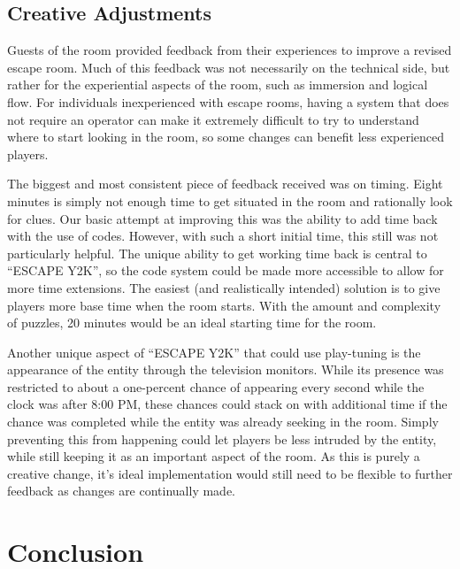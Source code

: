 \documentclass[conference]{IEEEtran}
\begin{document}
\subsection{Creative Adjustments}
Guests of the room provided feedback from their experiences to improve a revised escape room. Much of this feedback was 
not necessarily on the technical side, but rather for the experiential aspects of the room, such as immersion and logical 
flow. For individuals inexperienced with escape rooms, having a system that does not require an operator can make it extremely 
difficult to try to understand where to start looking in the room, so some changes can benefit less experienced players.

\indent The biggest and most consistent piece of feedback received was on timing. Eight minutes is simply not enough time to 
get situated in the room and rationally look for clues. Our basic attempt at improving this was the ability to add time back 
with the use of codes. However, with such a short initial time, this still was not particularly helpful. The unique ability 
to get working time back is central to ``ESCAPE Y2K'', so the code system could be made more accessible to allow for more time 
extensions. The easiest (and realistically intended) solution is to give players more base time when the room starts. With the 
amount and complexity of puzzles, 20 minutes would be an ideal starting time for the room.

\indent Another unique aspect of ``ESCAPE Y2K'' that could use play-tuning is the appearance of the entity through the television 
monitors. While its presence was restricted to about a one-percent chance of appearing every second while the clock was after 
8:00 PM, these chances could stack on with additional time if the chance was completed while the entity was already seeking in 
the room. Simply preventing this from happening could let players be less intruded by the entity, while still keeping it as an 
important aspect of the room. As this is purely a creative change, it's ideal implementation would still need to be flexible to 
further feedback as changes are continually made.


\section{Conclusion} %
\end{document}
